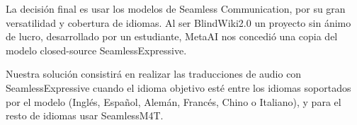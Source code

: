 La decisión final es usar los modelos de Seamless Communication, por su gran versatilidad y cobertura de idiomas. Al ser BlindWiki2.0 un proyecto sin ánimo de lucro, desarrollado por un estudiante, MetaAI nos concedió una copia del modelo closed-source SeamlessExpressive.

Nuestra solución consistirá en realizar las traducciones de audio con SeamlessExpressive cuando el idioma objetivo esté entre los idiomas soportados por el modelo (Inglés, Español, Alemán, Francés, Chino o Italiano), y para el resto de idiomas usar SeamlessM4T.
